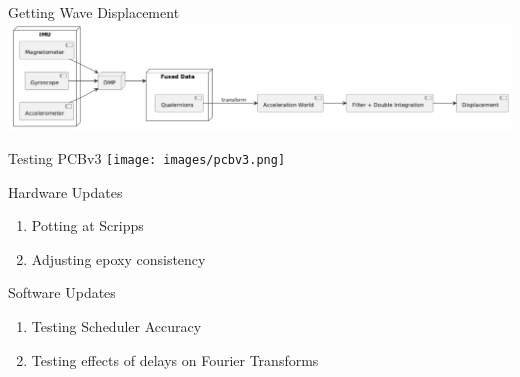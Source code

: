 

\begin{frame}{Getting Wave Displacement}
    \centering
    \includegraphics[height=1\textheight,width=1\textwidth,keepaspectratio]{images/wavedisp2.png}
\end{frame}

\begin{frame}{Testing PCBv3}
    \centering
    \texttt{[image: images/pcbv3.png]}
\end{frame}









\begin{frame}{Hardware Updates}
      \begin{enumerate}
          \item Potting at Scripps
           \item Adjusting epoxy consistency
    \end{enumerate}
\end{frame}

\begin{frame}{Software Updates}
    \begin{enumerate}
        \item Testing Scheduler Accuracy
        \item Testing effects of delays on Fourier Transforms
  \end{enumerate}
\end{frame}




